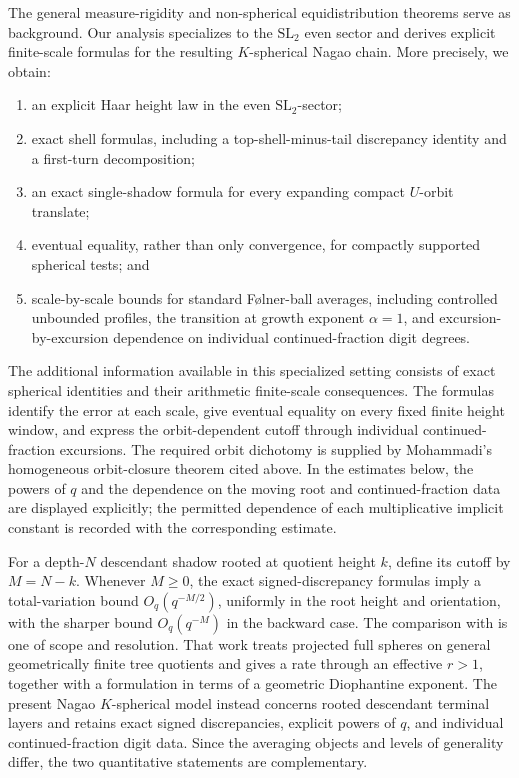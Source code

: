\documentclass[11pt]{amsart}
\theoremstyle{definition}
\theoremstyle{plain}
\begin{document}
The general measure-rigidity and non-spherical equidistribution theorems serve
as background.  Our analysis specializes to the \(\mathrm{SL}_2\) even sector
and derives explicit finite-scale formulas for the resulting \(K\)-spherical
Nagao chain.  More precisely, we obtain:
\begin{enumerate}[label=(\roman*),leftmargin=2.2em]
\item an explicit Haar height law in the even \(\mathrm{SL}_2\)-sector;
\item exact shell formulas, including a top-shell-minus-tail discrepancy
identity and a first-turn decomposition;
\item an exact single-shadow formula for every expanding compact
\(U\)-orbit translate;
\item eventual equality, rather than only convergence, for compactly
supported spherical tests; and
\item scale-by-scale bounds for standard F{\o}lner-ball averages, including
controlled unbounded profiles, the transition at growth exponent \(\alpha=1\),
and excursion-by-excursion dependence on individual continued-fraction digit
degrees.
\end{enumerate}
The additional information available in this specialized setting consists of
exact spherical identities and their arithmetic finite-scale consequences.
The formulas identify the error at each scale, give eventual equality on every
fixed finite height window, and express the orbit-dependent cutoff through
individual continued-fraction excursions.  The required orbit dichotomy is
supplied by Mohammadi's homogeneous orbit-closure theorem cited above.  In the
estimates below, the powers of \(q\) and the dependence on the moving root and
continued-fraction data are displayed explicitly; the permitted dependence of
each multiplicative implicit constant is recorded with the corresponding
estimate.

For a depth-\(N\) descendant shadow rooted at quotient height \(k\), define its
cutoff by \(M=N-k\).  Whenever \(M\ge0\), the exact signed-discrepancy formulas
imply a total-variation bound \(O_q(q^{-M/2})\), uniformly in the root height
and orientation, with the sharper bound \(O_q(q^{-M})\) in the backward case.
The comparison with \cite{CFS2022} is one of scope and resolution.  That work
treats projected full spheres on general geometrically finite tree quotients
and gives a rate through an effective \(r>1\), together with a formulation in
terms of a geometric Diophantine exponent.  The present Nagao
\(K\)-spherical model instead concerns rooted descendant terminal layers and
retains exact signed discrepancies, explicit powers of \(q\), and individual
continued-fraction digit data.  Since the averaging objects and levels of
generality differ, the two quantitative statements are complementary.
\end{document}
